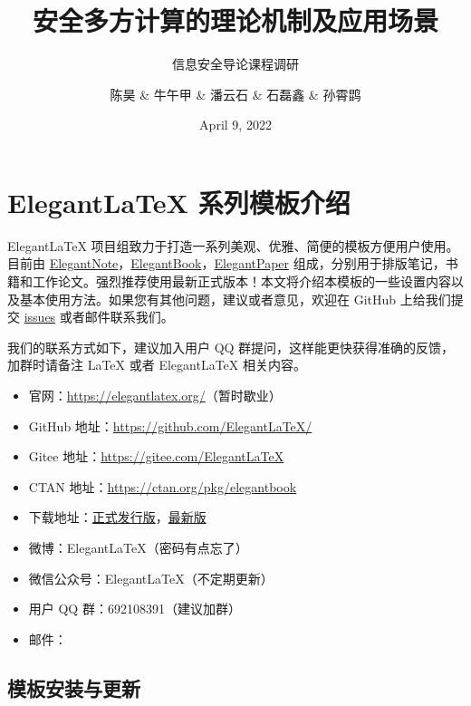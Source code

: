 \documentclass[lang=cn,10pt]{elegantbook}
\title{安全多方计算的理论机制及应用场景}
\subtitle{信息安全导论课程调研}
\author{陈昊 \& 牛午甲 \& 潘云石 \& 石磊鑫 \& 孙霄鹍}
\institute{Elegant\LaTeX{} Program}
\date{April 9, 2022}
\begin{document}
\maketitle
\frontmatter

\tableofcontents

\mainmatter

\chapter{Elegant\LaTeX{} 系列模板介绍}

Elegant\LaTeX{} 项目组致力于打造一系列美观、优雅、简便的模板方便用户使用。目前由 \href{https://github.com/ElegantLaTeX/ElegantNote}{ElegantNote}，\href{https://github.com/ElegantLaTeX/ElegantBook}{ElegantBook}，\href{https://github.com/ElegantLaTeX/ElegantPaper}{ElegantPaper} 组成，分别用于排版笔记，书籍和工作论文。强烈推荐使用最新正式版本！本文将介绍本模板的一些设置内容以及基本使用方法。如果您有其他问题，建议或者意见，欢迎在 GitHub 上给我们提交 \href{https://github.com/ElegantLaTeX/ElegantBook/issues}{issues} 或者邮件联系我们。

我们的联系方式如下，建议加入用户 QQ 群提问，这样能更快获得准确的反馈，加群时请备注 \LaTeX{} 或者 Elegant\LaTeX{} 相关内容。
\begin{itemize}
  \item 官网：\href{https://elegantlatex.org/}{https://elegantlatex.org/}（暂时歇业）
  \item GitHub 地址：\href{https://github.com/ElegantLaTeX/}{https://github.com/ElegantLaTeX/}
  \item Gitee 地址：\href{https://gitee.com/ElegantLaTeX}{https://gitee.com/ElegantLaTeX}
  \item CTAN 地址：\href{https://ctan.org/pkg/elegantbook}{https://ctan.org/pkg/elegantbook}
  \item 下载地址：\href{https://github.com/ElegantLaTeX/ElegantBook/releases}{正式发行版}，\href{https://github.com/ElegantLaTeX/ElegantBook/archive/master.zip}{最新版}
  \item 微博：Elegant\LaTeX{}（密码有点忘了）
  \item 微信公众号：Elegant\LaTeX{}（不定期更新）
  \item 用户 QQ 群：692108391（建议加群）
  \item 邮件：
\end{itemize}

\section{模板安装与更新}
\end{document}
